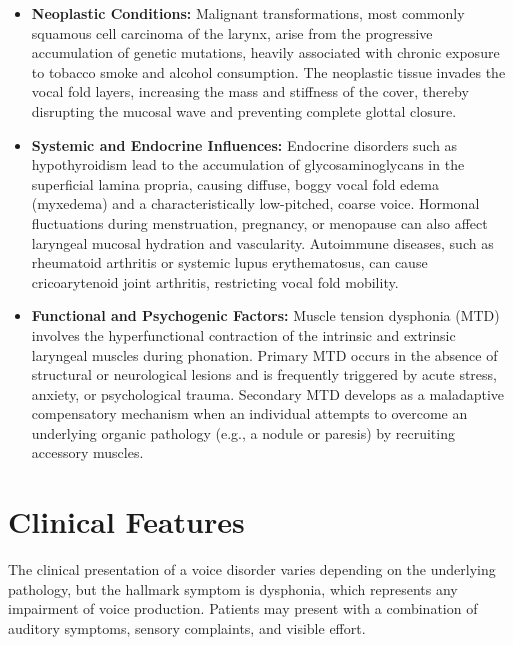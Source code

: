 \begin{itemize}
    \item \textbf{Neoplastic Conditions:} Malignant transformations, most commonly squamous cell carcinoma of the larynx, arise from the progressive accumulation of genetic mutations, heavily associated with chronic exposure to tobacco smoke and alcohol consumption. The neoplastic tissue invades the vocal fold layers, increasing the mass and stiffness of the cover, thereby disrupting the mucosal wave and preventing complete glottal closure.
    \item \textbf{Systemic and Endocrine Influences:} Endocrine disorders such as hypothyroidism lead to the accumulation of glycosaminoglycans in the superficial lamina propria, causing diffuse, boggy vocal fold edema (myxedema) and a characteristically low-pitched, coarse voice. Hormonal fluctuations during menstruation, pregnancy, or menopause can also affect laryngeal mucosal hydration and vascularity. Autoimmune diseases, such as rheumatoid arthritis or systemic lupus erythematosus, can cause cricoarytenoid joint arthritis, restricting vocal fold mobility.
    \item \textbf{Functional and Psychogenic Factors:} Muscle tension dysphonia (MTD) involves the hyperfunctional contraction of the intrinsic and extrinsic laryngeal muscles during phonation. Primary MTD occurs in the absence of structural or neurological lesions and is frequently triggered by acute stress, anxiety, or psychological trauma. Secondary MTD develops as a maladaptive compensatory mechanism when an individual attempts to overcome an underlying organic pathology (e.g., a nodule or paresis) by recruiting accessory muscles.
\end{itemize}

\section*{Clinical Features}
The clinical presentation of a voice disorder varies depending on the underlying pathology, but the hallmark symptom is dysphonia, which represents any impairment of voice production. Patients may present with a combination of auditory symptoms, sensory complaints, and visible effort.

